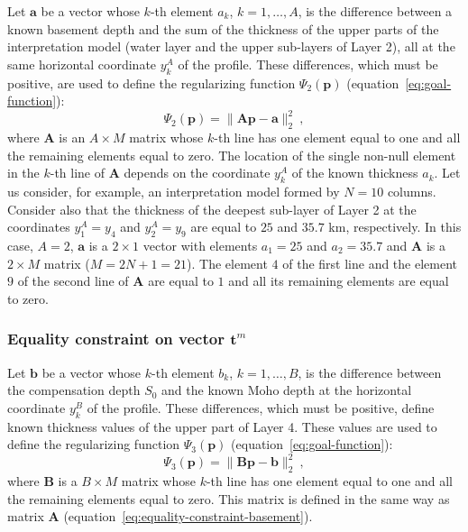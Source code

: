 \documentclass[manuscript]{geophysics}
\begin{document}
Let $\mathbf{a}$ be a vector whose $k$-th element $a_{k}$,
$k = 1, \dots, A$, is the difference between a known basement depth and
the sum of the thickness of the upper parts of the interpretation model
(water layer and the upper sub-layers of Layer 2), all at the same
horizontal coordinate $y^{A}_{k}$ of the profile. 
These differences, which must be positive, are used to define 
the regularizing function $\Psi_{2}(\mathbf{p})$ 
(equation~\ref{eq:goal-function}):
\begin{equation}
\Psi_{2}(\mathbf{p}) = \| \mathbf{A}\mathbf{p} - \mathbf{a} \|_{2}^{2} \: ,
\label{eq:equality-constraint-basement}
\end{equation}
where $\mathbf{A}$ is an $A \times M$ matrix whose $k$-th line has one element 
equal to one and all the remaining elements equal to zero. The location of the
single non-null element in the $k$-th line of $\mathbf{A}$ depends on the coordinate
$y^{A}_{k}$ of the known thickness $a_{k}$. Let us consider, 
for example, an interpretation model formed by $N = 10$ columns. Consider also that 
the thickness of the deepest sub-layer of Layer 2  
at the coordinates $y^{A}_{1} = y_{4}$ and $y^{A}_{2} = y_{9}$ 
are equal to $25$ and $35.7$ km, respectively. In this case, $A = 2$,
$\mathbf{a}$ is a $2 \times 1$ vector with elements $a_{1} = 25$ and $a_{2} = 35.7$
and $\mathbf{A}$ is a $2 \times M$ matrix ($M = 2N + 1 = 21$). The element $4$ of the
first line and the element $9$ of the second line of $\mathbf{A}$ are equal to $1$ and
all its remaining elements are equal to zero.

\subsubsection*{Equality constraint on vector $\mathbf{t}^{m}$}

Let $\mathbf{b}$ be a vector whose $k$-th element $b_{k}$,
$k = 1, \dots, B$, is the difference between the compensation depth
$S_{0}$ and the known Moho depth at the horizontal coordinate $y^{B}_{k}$ of the
profile. These differences, which must be positive, define known thickness values
of the upper part of Layer 4. These values are used to define the 
regularizing function $\Psi_{3}(\mathbf{p})$ (equation~\ref{eq:goal-function}):
\begin{equation}
\Psi_{3}(\mathbf{p}) = \| \mathbf{B}\mathbf{p} - \mathbf{b} \|_{2}^{2} \: ,
\label{eq:equality-constraint-moho}
\end{equation}
where $\mathbf{B}$ is a $B \times M$ matrix whose $k$-th line has one element 
equal to one and all the remaining elements equal to zero. This matrix is defined 
in the same way as matrix $\mathbf{A}$ (equation~\ref{eq:equality-constraint-basement}).
\end{document}
